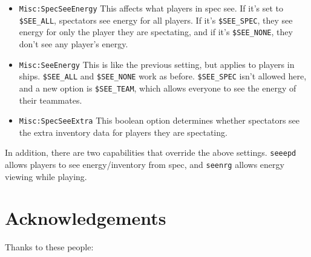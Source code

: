 \documentclass{article}
\begin{document}
\begin{itemize}

\item{\texttt{Misc:SpecSeeEnergy}}
This affects what players in spec see. If it's set to \verb/$SEE_ALL/,
spectators see energy for all players. If it's \verb/$SEE_SPEC/, they
see energy for only the player they are spectating, and if it's
\verb/$SEE_NONE/, they don't see any player's energy.

\item{\texttt{Misc:SeeEnergy}}
This is like the previous setting, but applies to players in ships.
\verb/$SEE_ALL/ and \verb/$SEE_NONE/ work as before. \verb/$SEE_SPEC/
isn't allowed here, and a new option is \verb/$SEE_TEAM/, which allows
everyone to see the energy of their teammates.

\item{\texttt{Misc:SpecSeeExtra}}
This boolean option determines whether spectators see the extra
inventory data for players they are spectating.

\end{itemize}

In addition, there are two capabilities that override the above
settings. \verb/seeepd/ allows players to see energy/inventory from
spec, and \verb/seenrg/ allows energy viewing while playing.


\section{Acknowledgements}

Thanks to these people:
\end{document}
